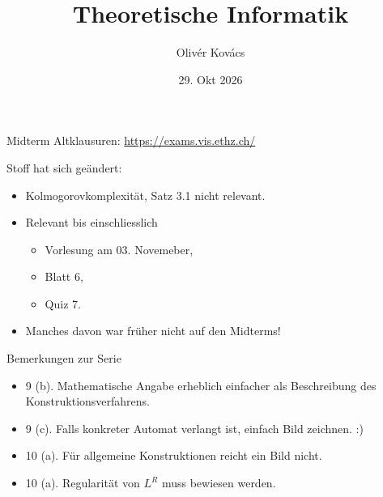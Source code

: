 \documentclass[11pt,aspectratio=169]{beamer}
\title{Theoretische Informatik}
\date[]{29. Okt 2026}
\author{Olivér Kovács}
\begin{document}

\titleframe



\begin{frame}{Midterm}
    Altklausuren: \href{https://exams.vis.ethz.ch/}{https://exams.vis.ethz.ch/}

    \vspace{1em}

    Stoff hat sich geändert:
    \begin{itemize}
    \item
        Kolmogorovkomplexität, Satz 3.1 nicht relevant.
    \item
        Relevant bis einschliesslich
        \begin{itemize}
            \item
                Vorlesung am 03. Novemeber,
            \item
                Blatt 6,
            \item
                Quiz 7.
        \end{itemize}
    \item Manches davon war früher nicht auf den Midterms!
    \end{itemize}
\end{frame}

\begin{frame}{Bemerkungen zur Serie}
    \begin{itemize}
    \item
        9 (b). Mathematische Angabe erheblich einfacher als Beschreibung des Konstruktionsverfahrens.
        \vspace{1em}
    \item
        9 (c). Falls konkreter Automat verlangt ist, einfach Bild zeichnen. :)
        \vspace{1em}
    \item
        10 (a). Für allgemeine Konstruktionen reicht ein Bild nicht.
        \vspace{1em}
    \item
        10 (a). Regularität von \(L^R\) muss bewiesen werden.
    \end{itemize}
\end{frame}
\end{document}
